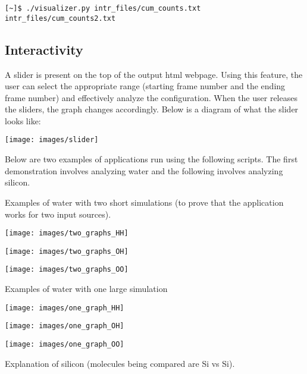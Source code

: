 \begin{verbatim}
[~]$ ./visualizer.py intr_files/cum_counts.txt intr_files/cum_counts2.txt 
\end{verbatim}


\subsection*{Interactivity}

A slider is present on the top of the output html webpage. Using this feature, the user can select the appropriate range (starting frame number and the ending frame number) and effectively analyze the configuration. When the user releases the sliders, the graph changes accordingly. Below is a diagram of what the slider looks like:


\texttt{[image: images/slider]}


Below are two examples of applications run using the following scripts. The first demonstration involves analyzing water and the following involves analyzing silicon. 

Examples of water with two short simulations (to prove that the application works for two input sources).

\texttt{[image: images/two\_graphs\_HH]}

\texttt{[image: images/two\_graphs\_OH]}

\texttt{[image: images/two\_graphs\_OO]}

Examples of water with one large simulation

\texttt{[image: images/one\_graph\_HH]}

\texttt{[image: images/one\_graph\_OH]}

\texttt{[image: images/one\_graph\_OO]}

Explanation of silicon (molecules being compared are Si vs Si).

